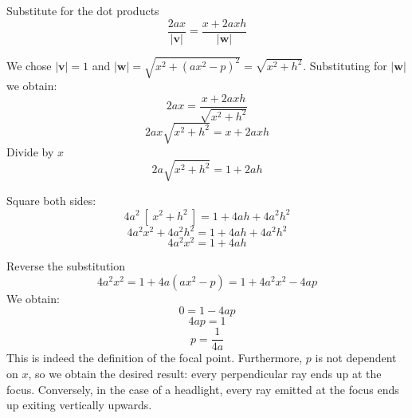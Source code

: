 \documentclass[11pt, oneside]{article}
\begin{document}
Substitute for the dot products
\[ \frac{ 2ax}{ |\mathbf{v}|}
 = \frac{x + 2axh}{ |\mathbf{w}|} \]
 
We chose $| \mathbf{v} | = 1$ and $| \mathbf{w} | = \sqrt{x^2 + (ax^2 - p)^2} = \sqrt{x^2 + h^2}$.  Substituting for $|\mathbf{w}|$ we obtain:
\[ 2ax = \frac{x + 2axh}{\sqrt{x^2 + h^2}} \]
\[ 2ax \sqrt{x^2 + h^2} = x + 2axh \]
Divide by $x$
\[ 2a \sqrt{x^2 + h^2} = 1 + 2ah \]

Square both sides:
\[ 4a^2 \ [ \ x^2 + h^2 \ ] = 1 + 4ah + 4a^2h^2 \]
\[ 4a^2x^2 + 4a^2h^2 = 1 + 4ah + 4a^2h^2 \]
\[ 4a^2x^2 = 1 + 4ah \]

Reverse the substitution
\[ 4a^2x^2 = 1 + 4a(ax^2 - p) = 1 + 4a^2x^2 - 4ap \]
 We obtain:
\[ 0 = 1 - 4ap \]
\[ 4ap = 1 \]
\[ p = \frac{1}{4a} \]
This is indeed the definition of the focal point.  Furthermore, $p$ is not dependent on $x$, so we obtain the desired result:  every perpendicular ray ends up at the focus.  Conversely, in the case of a headlight, every ray emitted at the focus ends up exiting vertically upwards.
\end{document}
